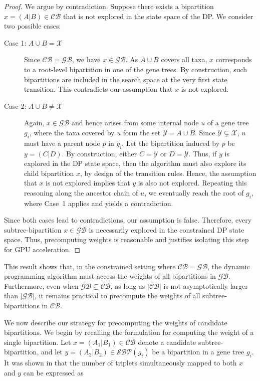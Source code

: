 \documentclass[runningheads]{llncs}
\begin{document}
\begin{proof}
    We argue by contradiction. Suppose there exists a bipartition $x = (A|B) \in \mathcal{CB}$ that is not explored in the state space of the DP. We consider two possible cases:

    \begin{description}
        \item[Case 1: $A \cup B = \mathcal{X}$]  
        Since $\mathcal{CB} = \mathcal{GB}$, we have $x \in \mathcal{GB}$. As $A \cup B$ covers all taxa, $x$ corresponds to a root-level bipartition in one of the gene trees. By construction, such bipartitions are included in the search space at the very first state transition. This contradicts our assumption that $x$ is not explored.

        \item[Case 2: $A \cup B \neq \mathcal{X}$]  
        Again, $x \in \mathcal{GB}$ and hence arises from some internal node $u$ of a gene tree $g_i$, where the taxa covered by $u$ form the set $\mathcal{Y} = A \cup B$. Since $\mathcal{Y} \subsetneq \mathcal{X}$, $u$ must have a parent node $p$ in $g_i$. Let the bipartition induced by $p$ be $y = (C|D)$. By construction, either $C = \mathcal{Y}$ or $D = \mathcal{Y}$. Thus, if $y$ is explored in the DP state space, then the algorithm must also explore its child bipartition $x$, by design of the transition rules. Hence, the assumption that $x$ is not explored implies that $y$ is also not explored. Repeating this reasoning along the ancestor chain of $u$, we eventually reach the root of $g_i$, where Case~1 applies and yields a contradiction.
    \end{description}

    Since both cases lead to contradictions, our assumption is false. Therefore, every subtree-bipartition $x \in \mathcal{GB}$ is necessarily explored in the constrained DP state space. Thus, precomputing weights is reasonable and justifies isolating this step for GPU acceleration.
\end{proof}

This result shows that, in the constrained setting where $\mathcal{CB} = \mathcal{GB}$, the dynamic programming algorithm must access the weights of all bipartitions in $\mathcal{GB}$. Furthermore, even when $\mathcal{GB} \subsetneq \mathcal{CB}$, as long as $|\mathcal{CB}|$ is not asymptotically larger than $|\mathcal{GB}|$, it remains practical to precompute the weights of all subtree-bipartitions in $\mathcal{CB}$.


We now describe our strategy for precomputing the weights of candidate bipartitions. We begin by recalling the formulation for computing the weight of a single bipartition. Let $x = (A_1|B_1) \in \mathcal{CB}$ denote a candidate subtree-bipartition, and let $y = (A_2|B_2) \in \mathcal{SBP}(g_i)$ be a bipartition in a gene tree $g_i$. It was shown in \cite{Islam-STELAR-2020} that the number of triplets simultaneously mapped to both $x$ and $y$ can be expressed as
\end{document}
